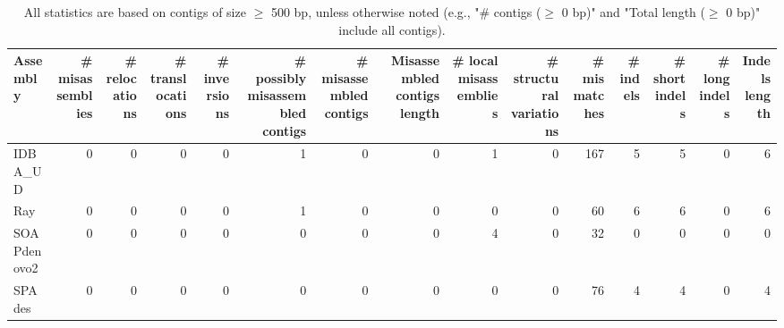 \documentclass[12pt,a4paper]{article}
\begin{document}
\begin{table}[ht]
\begin{center}
\caption{All statistics are based on contigs of size $\geq$ 500 bp, unless otherwise noted (e.g., "\# contigs ($\geq$ 0 bp)" and "Total length ($\geq$ 0 bp)" include all contigs).}
\begin{tabular}{|l*{14}{|r}|}
\hline
Assembly & \# misassemblies &     \# relocations &     \# translocations &     \# inversions & \# possibly misassembled contigs & \# misassembled contigs & Misassembled contigs length & \# local misassemblies & \# structural variations & \# mismatches & \# indels &     \# short indels &     \# long indels & Indels length \\ \hline
IDBA\_UD & 0 & 0 & 0 & 0 & 1 & 0 & 0 & 1 & 0 & 167 & 5 & 5 & 0 & 6 \\ \hline
Ray & 0 & 0 & 0 & 0 & 1 & 0 & 0 & 0 & 0 & 60 & 6 & 6 & 0 & 6 \\ \hline
SOAPdenovo2 & 0 & 0 & 0 & 0 & 0 & 0 & 0 & 4 & 0 & 32 & 0 & 0 & 0 & 0 \\ \hline
SPAdes & 0 & 0 & 0 & 0 & 0 & 0 & 0 & 0 & 0 & 76 & 4 & 4 & 0 & 4 \\ \hline
\end{tabular}
\end{center}
\end{table}
\end{document}
